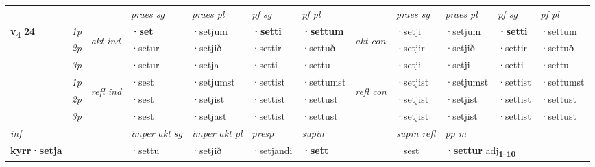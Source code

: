 \begin{longtable}[l]{X>{\footnotesize\itshape}llXXXXlXXXX}
 & &   & \textit{praes sg}  & \textit{praes pl}    & \textit{ pf sg} & \textit{pf pl} & & \textit{praes sg}  & \textit{praes pl}    & \textit{pf sg} & \textit{pf pl }  \\ \cmidrule{4-7} \cmidrule{9-12}
 \multirow{2}{*}{{{\textbf{v{\textsubscript{4}}} \Large{\textbf{24}}}}}  & 1p & \multirow{3}{*}{\begin{turn}{90}\textit{akt ind}\end{turn}} & \textbf{·set} & ·setjum & \textbf{·setti} & \textbf{·settum} & \multirow{3}{*}{\begin{turn}{90}\textit{akt con}\end{turn}} &·setji & ·setjum & \textbf{·setti} & ·settum\\*
 & 2p &  &  ·setur  & ·setjið & ·settir & ·settuð & & ·setjir & ·setjið & ·settir & ·settuð \\*
 & 3p &  & ·setur & ·setja & ·setti & ·settu & & ·setji & ·setji& ·setti & ·settu \\*
\cmidrule{4-7} \cmidrule{9-12}
 & 1p & \multirow{3}{*}{\begin{turn}{90}\textit{refl ind}\end{turn}}  & ·sest & ·setjumst & ·settist & ·settumst & \multirow{3}{*}{\begin{turn}{90}\textit{refl con}\end{turn}}  &·setjist & ·setjumst & ·settist & ·settumst \\*
 & 2p &  & ·sest & ·setjist & ·settist & ·settust & &·setjist & ·setjist & ·settist & ·settust \\*
 & 3p  & & ·sest & ·setjast & ·settist & ·settust & & ·setjist & ·setjist& ·settist & ·settust \\*
\cmidrule{4-7} \cmidrule{9-12}

   {\textit{inf}} & &  & \textit{imper akt sg} & \textit{imper akt pl}   & \textit{presp} & \textit{supin} && \textit{supin refl} & \textit{pp m} \\*
  {\textbf{kyrr\allowbreak ·setja}} & && ·settu  & ·setjið   & ·setjandi &  \textbf{·sett} && ·sest & \multicolumn{2}{l}{\textbf{·settur} adj\textbf{\textsubscript{1-10}}} \\*

\midrule


\end{longtable}
